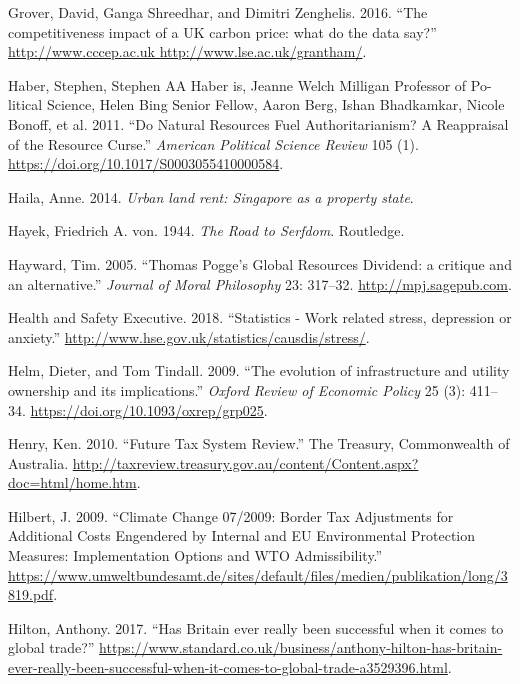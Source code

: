 \documentclass[]{tufte-handout}
\begin{document}
\leavevmode\hypertarget{ref-Grover2016}{}%
Grover, David, Ganga Shreedhar, and Dimitri Zenghelis. 2016. ``The
competitiveness impact of a UK carbon price: what do the data say?''
\href{http://www.cccep.ac.uk\%20http://www.lse.ac.uk/grantham/}{http://www.cccep.ac.uk http://www.lse.ac.uk/grantham/}.

\leavevmode\hypertarget{ref-Haber2011}{}%
Haber, Stephen, Stephen AA Haber is, Jeanne Welch Milligan Professor of
Po-litical Science, Helen Bing Senior Fellow, Aaron Berg, Ishan
Bhadkamkar, Nicole Bonoff, et al. 2011. ``Do Natural Resources Fuel
Authoritarianism? A Reappraisal of the Resource Curse.'' \emph{American
Political Science Review} 105 (1).
\url{https://doi.org/10.1017/S0003055410000584}.

\leavevmode\hypertarget{ref-Haila2015}{}%
Haila, Anne. 2014. \emph{Urban land rent: Singapore as a property
state}.

\leavevmode\hypertarget{ref-Hayek1944}{}%
Hayek, Friedrich A. von. 1944. \emph{The Road to Serfdom}. Routledge.

\leavevmode\hypertarget{ref-Hayward2005}{}%
Hayward, Tim. 2005. ``Thomas Pogge's Global Resources Dividend: a
critique and an alternative.'' \emph{Journal of Moral Philosophy} 23:
317--32. \url{http://mpj.sagepub.com}.

\leavevmode\hypertarget{ref-HealthandSafetyExecutive2018}{}%
Health and Safety Executive. 2018. ``Statistics - Work related stress,
depression or anxiety.''
\url{http://www.hse.gov.uk/statistics/causdis/stress/}.

\leavevmode\hypertarget{ref-Helm2009}{}%
Helm, Dieter, and Tom Tindall. 2009. ``The evolution of infrastructure
and utility ownership and its implications.'' \emph{Oxford Review of
Economic Policy} 25 (3): 411--34.
\url{https://doi.org/10.1093/oxrep/grp025}.

\leavevmode\hypertarget{ref-Henry2010}{}%
Henry, Ken. 2010. ``Future Tax System Review.'' The Treasury,
Commonwealth of Australia.
\url{http://taxreview.treasury.gov.au/content/Content.aspx?doc=html/home.htm}.

\leavevmode\hypertarget{ref-Hilbert2009}{}%
Hilbert, J. 2009. ``Climate Change 07/2009: Border Tax Adjustments for
Additional Costs Engendered by Internal and EU Environmental Protection
Measures: Implementation Options and WTO Admissibility.''
\url{https://www.umweltbundesamt.de/sites/default/files/medien/publikation/long/3819.pdf}.

\leavevmode\hypertarget{ref-Hilton2017}{}%
Hilton, Anthony. 2017. ``Has Britain ever really been successful when it
comes to global trade?''
\url{https://www.standard.co.uk/business/anthony-hilton-has-britain-ever-really-been-successful-when-it-comes-to-global-trade-a3529396.html}.
\end{document}
